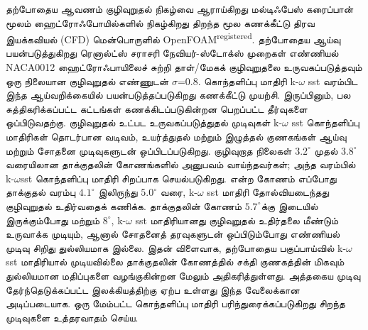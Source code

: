 \newpage
\begin{changemargin}{1cm}{1cm}

\begin{Abstract}
\thispagestyle{plain}
\vspace{1cm}

\begin{Tamil}

\textbf{}

தற்போதைய ஆவணம் குழிவுறுதல் நிகழ்வை ஆராய்கிறது
மல்டிஃபேஸ் கரைப்பான் மூலம் ஹைட்ரோஃபோயில்களில் நிகழ்கிறது
திறந்த மூல கணக்கீட்டு திரவ இயக்கவியல் (CFD) மென்பொருளில்
OpenFOAM\textsuperscript{\text registered}. தற்போதைய ஆய்வு பயன்படுத்துகிறது
ரெனால்ட்ஸ் சராசரி நேவியர்-ஸ்டோக்ஸ் முறைகள் எண்ணியல்
NACA0012 ஹைட்ரோஃபாயிலைச் சுற்றி தாள்/மேகக் குழிவுறுதலை உருவகப்படுத்தவும்
ஒரு நிலையான குழிவுறுதல் எண்ணுடன் $\sigma$=0.8.
கொந்தளிப்பு மாதிரி k-$\omega$ sst வரம்பிட இந்த ஆய்வறிக்கையில் பயன்படுத்தப்படுகிறது
கணக்கீட்டு முயற்சி. இருப்பினும், பல சுத்திகரிக்கப்பட்ட கட்டங்கள் கணக்கிடப்படுகின்றன
பெறப்பட்ட தீர்வுகளை ஒப்பிடுவதற்கு. குழிவுறுதல் உட்பட உருவகப்படுத்துதல் முடிவுகள்
k-$\omega$ sst கொந்தளிப்பு மாதிரிகள் தொடர்பான வடிவம், உயர்த்துதல் மற்றும் இழுத்தல் குணகங்கள்
ஆய்வு மற்றும் சோதனை முடிவுகளுடன் ஒப்பிடப்படுகிறது. குழிவுறாத நிலைகள்
$3.2^{\circ}$ முதல் $3.8^{\circ}$ வரையிலான தாக்குதலின் கோணங்களில் அனுபவம் வாய்ந்தவர்கள்;
அந்த வரம்பில் k-$\omega$sst கொந்தளிப்பு மாதிரி சிறப்பாக செயல்படுகிறது. என்ற கோணம் எப்போது
தாக்குதல் வரம்பு $4.1^{\circ}$ இலிருந்து $5.0^{\circ}$ வரை, k-$\omega$ sst மாதிரி தோல்வியடைந்தது
குழிவுறுதல் உதிர்வதைக் கணிக்க. தாக்குதலின் கோணம் $5.7^{\circ}$க்கு இடையில் இருக்கும்போது
மற்றும் $8^{\circ}$, k-$\omega$ sst மாதிரியானது குழிவுறுதல் உதிர்தலை மீண்டும் உருவாக்க முடியும்,
ஆனால் சோதனைத் தரவுகளுடன் ஒப்பிடும்போது எண்ணியல் முடிவு சிறிது துல்லியமாக இல்லை.
இதன் விளைவாக, தற்போதைய பகுப்பாய்வில் k-$\omega$ sst மாதிரியால் முடியவில்லை
தாக்குதலின் கோணத்தில் சக்தி குணகத்தின் மிகவும் துல்லியமான மதிப்புகளை வழங்குகின்றன
மேலும் அதிகரித்துள்ளது. அத்தகைய முடிவு தேர்ந்தெடுக்கப்பட்ட இலக்கியத்திற்கு ஏற்ப உள்ளது
இந்த வேலைக்கான அடிப்படையாக. ஒரு மேம்பட்ட கொந்தளிப்பு மாதிரி பரிந்துரைக்கப்படுகிறது
சிறந்த முடிவுகளை உத்தரவாதம் செய்ய.

\end{Tamil}


\end{Abstract}
\end{changemargin}
